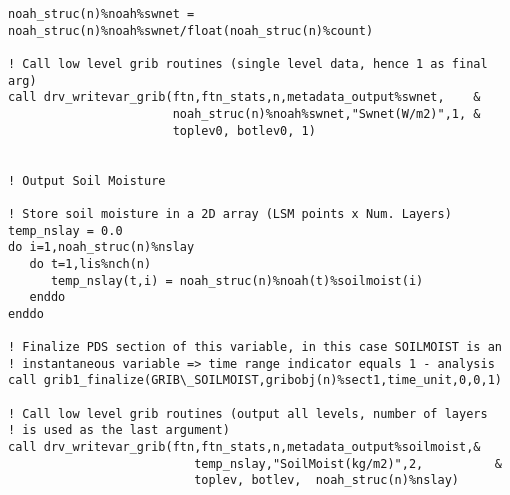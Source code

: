 \begin{verbatim}
noah_struc(n)%noah%swnet = noah_struc(n)%noah%swnet/float(noah_struc(n)%count)

! Call low level grib routines (single level data, hence 1 as final arg)
call drv_writevar_grib(ftn,ftn_stats,n,metadata_output%swnet,    &
                       noah_struc(n)%noah%swnet,"Swnet(W/m2)",1, &
                       toplev0, botlev0, 1)


! Output Soil Moisture

! Store soil moisture in a 2D array (LSM points x Num. Layers)
temp_nslay = 0.0
do i=1,noah_struc(n)%nslay
   do t=1,lis%nch(n)
      temp_nslay(t,i) = noah_struc(n)%noah(t)%soilmoist(i)
   enddo
enddo

! Finalize PDS section of this variable, in this case SOILMOIST is an
! instantaneous variable => time range indicator equals 1 - analysis
call grib1_finalize(GRIB\_SOILMOIST,gribobj(n)%sect1,time_unit,0,0,1)

! Call low level grib routines (output all levels, number of layers
! is used as the last argument)
call drv_writevar_grib(ftn,ftn_stats,n,metadata_output%soilmoist,&
                          temp_nslay,"SoilMoist(kg/m2)",2,          &
                          toplev, botlev,  noah_struc(n)%nslay)

\end{verbatim}

